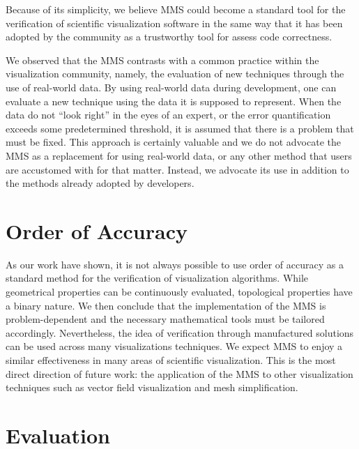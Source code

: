 %
%
Because of its simplicity, we believe MMS could become a standard tool for the verification of scientific visualization software in the same way that it has been adopted by the \cse{} community as a trustworthy tool for assess code correctness.


We observed that the MMS contrasts with a common practice within the visualization community, namely, the evaluation of new techniques through the use of real-world data.  
%
By using real-world data during development, one can evaluate a new technique using the data it is supposed to represent. 
%
When the data do not ``look right'' in the eyes of an expert, or the error quantification exceeds some predetermined threshold, it is assumed that there is a problem that must be fixed.
%
This approach is certainly valuable and we do not advocate the MMS as a replacement for using real-world data, or any other method that users are accustomed with for that matter. 
%
Instead, we advocate its use in addition to the methods already adopted by developers.

\section{Order of Accuracy}

As our work have shown, it is not always possible to use order of accuracy as a standard method for the verification of visualization algorithms. 
%
While geometrical properties can be continuously evaluated, topological properties have a binary nature.
%
We then conclude that the implementation of the MMS is problem-dependent and the necessary mathematical tools must be tailored accordingly. 
%
Nevertheless, the idea of verification through manufactured solutions can be used across many visualizations techniques. 
%
We expect MMS to enjoy a similar effectiveness in many areas of scientific visualization.
%
This is the most direct direction of future work: the application of the MMS to other visualization techniques such as vector field visualization and mesh simplification.


\section{Evaluation}

